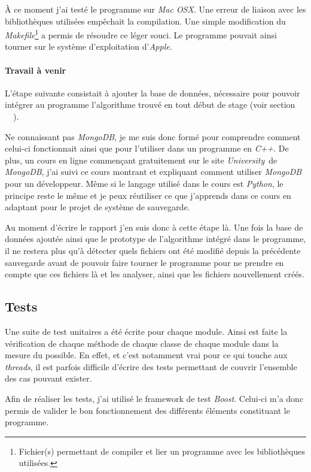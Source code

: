 \documentclass[a4paper,10pt, twoside]{report}
\begin{document}
\begin{spacing}{1.2}
À ce moment j'ai testé le programme sur \textit{Mac OSX}. Une erreur de
liaison avec les bibliothèques utilisées empêchait la compilation. Une
simple modification du \textit{Makefile}\footnote{Fichier(s) permettant de
compiler et lier un programme avec les bibliothèques utilisées.} a permis
de résoudre ce léger souci. Le programme pouvait ainsi tourner sur le
système d'exploitation d'\textit{Apple}.

\paragraph{Travail à venir}

L'étape suivante consistait à ajouter la base de données, nécessaire
pour pouvoir intégrer au programme l'algorithme trouvé en tout début de
stage (voir section \flqq~~\frqq).

Ne connaissant pas \textit{MongoDB}, je me suis donc formé pour comprendre
comment celui-ci fonctionnait ainsi que pour l'utiliser dans un programme en
\textit{C++}. De plus, un cours en ligne commençant gratuitement sur le site
\flqq\textit{University}\frqq~de \textit{MongoDB}\cite{refMongoDBUniversity},
j'ai suivi ce cours montrant et expliquant comment utiliser \textit{MongoDB}
pour un développeur. Même si le langage utilisé dans le cours est
\textit{Python}, le principe reste le même et je peux réutiliser ce que
j'apprends dans ce cours en adaptant pour le projet de système de sauvegarde.

Au moment d'écrire le rapport j'en suis donc à cette étape là. Une fois
la base de données ajoutée ainsi que le prototype de l'algorithme
intégré dans le programme, il ne restera plus qu'à détecter quels
fichiers ont été modifié depuis la précédente sauvegarde avant de
pouvoir faire tourner le programme pour ne prendre en compte que ces fichiers
là et les analyser, ainsi que les fichiers nouvellement créés.

\subsection{Tests}
Une suite de test unitaires a été écrite pour chaque module. Ainsi est
faite la vérification de chaque méthode de chaque classe de chaque module
dans la mesure du possible. En effet, et c'est notamment vrai pour ce qui touche
aux \textit{threads}, il est parfois difficile d'écrire des tests permettant
de couvrir l'ensemble des cas pouvant exister.

Afin de réaliser les tests, j'ai utilisé le framework de test
\textit{Boost}. Celui-ci m'a donc permis de valider le bon fonctionnement des
différents éléments constituant le programme.


\end{spacing}
\end{document}
